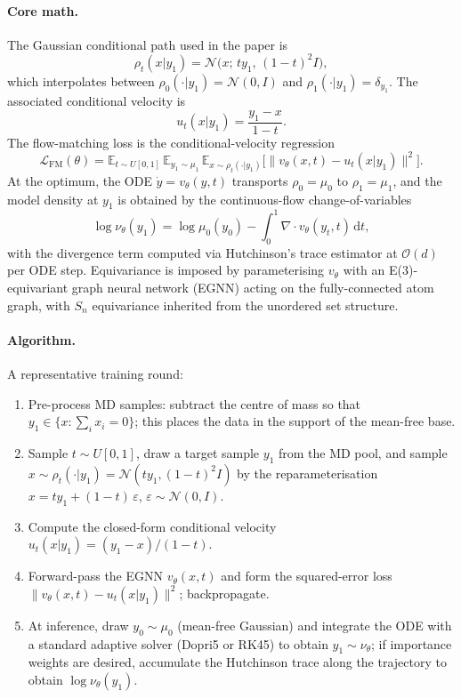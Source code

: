 \documentclass[11pt,letterpaper]{article}
\newcommand{\E}{\mathbb{E}}
\newcommand{\dd}{\mathrm{d}}
\theoremstyle{plain}
\begin{document}
\paragraph{Core math.} The Gaussian conditional path used in the paper is
\[
  \rho_t(x|y_1) = \mathcal N\!\big(x;\, t y_1,\, (1-t)^2 I\big),
\]
which interpolates between $\rho_0(\cdot|y_1)=\mathcal N(0,I)$ and
$\rho_1(\cdot|y_1)=\delta_{y_1}$. The associated conditional velocity is
\[
  u_t(x|y_1) = \frac{y_1 - x}{1-t}.
\]
The flow-matching loss is the conditional-velocity regression
\[
  \mathcal L_{\mathrm{FM}}(\theta)
  = \E_{t\sim U[0,1]}\,\E_{y_1\sim\mu_1}\,\E_{x\sim\rho_t(\cdot|y_1)}
  \!\Big[\big\|v_\theta(x,t) - u_t(x|y_1)\big\|^2\Big].
\]
At the optimum, the ODE $\dot y=v_\theta(y,t)$ transports $\rho_0=\mu_0$ to
$\rho_1=\mu_1$, and the model density at $y_1$ is obtained by the
continuous-flow change-of-variables
\[
  \log\nu_\theta(y_1) = \log\mu_0(y_0) - \int_0^1 \nabla\!\cdot v_\theta(y_t,t)\,\dd t,
\]
with the divergence term computed via Hutchinson's trace estimator at
$\mathcal O(d)$ per ODE step. Equivariance is imposed by parameterising
$v_\theta$ with an E(3)-equivariant graph neural network (EGNN) acting on the
fully-connected atom graph, with $S_n$ equivariance inherited from the
unordered set structure.

\paragraph{Algorithm.} A representative training round:
\begin{enumerate}\setlength{\itemsep}{2pt}
  \item Pre-process MD samples: subtract the centre of mass so that
    $y_1\in\{x:\sum_i x_i=0\}$; this places the data in the support of the
    mean-free base.
  \item Sample $t\sim U[0,1]$, draw a target sample $y_1$ from the MD pool, and
    sample $x\sim\rho_t(\cdot|y_1)=\mathcal N(t y_1,(1-t)^2 I)$ by the
    reparameterisation $x = t y_1 + (1-t)\,\varepsilon$, $\varepsilon\sim\mathcal N(0,I)$.
  \item Compute the closed-form conditional velocity $u_t(x|y_1)=(y_1-x)/(1-t)$.
  \item Forward-pass the EGNN $v_\theta(x,t)$ and form the squared-error loss
    $\|v_\theta(x,t)-u_t(x|y_1)\|^2$; backpropagate.
  \item At inference, draw $y_0\sim\mu_0$ (mean-free Gaussian) and integrate the
    ODE with a standard adaptive solver (Dopri5 or RK45) to obtain
    $y_1\sim\nu_\theta$; if importance weights are desired, accumulate the
    Hutchinson trace along the trajectory to obtain $\log\nu_\theta(y_1)$.
\end{enumerate}
\end{document}

